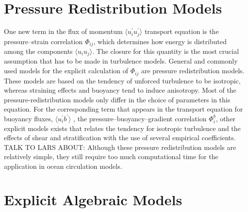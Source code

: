 \section{Pressure Redistribution Models}\label{pressresm}

One new term in the flux of momentum 
$\langle u_i^\prime u_j^\prime \rangle$ transport equation is the 
pressure--strain correlation $\Phi_{ij}$, which determines how energy is 
distributed among the components $\langle u_i u_j \rangle$. The closure for 
this quantity is the most crucial assumption that has to be made in turbulence 
models. General and commonly used models for the explicit 
calculation of $\Phi_{ij}$ are pressure redistribution models. These models are 
based on the tendency of unforced turbulence to be isotropic, whereas straining 
effects and buoyancy tend to induce anisotropy. Most of the 
pressure-redistribution models only 
differ in the choice of parameters in this equation. For the corresponding term 
that appears in the 
transport equation for buoyancy fluxes, $\langle u_i^\prime b^\prime \rangle$ , 
the pressure--buoyancy--gradient correlation $\Phi_i^b$, other explicit models 
exists that relates the tendency for isotropic 
turbulence and the effects of shear and stratification with the use of several 
empirical coefficients. TALK TO LARS ABOUT: Although these pressure 
redistribution models are 
relatively simple, they still require too much computational time for the 
application in ocean circulation models. 

\section{Explicit Algebraic Models}

